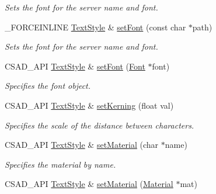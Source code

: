 \begin{DoxyCompactItemize}
\begin{DoxyCompactList}\small\item\em Sets the font for the server name and font. \end{DoxyCompactList}\item 
\hypertarget{classcsad_1_1_text_style_a6f824301e998e89906f260faa48f86ee}{\-\_\-\-F\-O\-R\-C\-E\-I\-N\-L\-I\-N\-E \hyperlink{classcsad_1_1_text_style}{Text\-Style} \& \hyperlink{classcsad_1_1_text_style_a6f824301e998e89906f260faa48f86ee}{set\-Font} (const char $\ast$path)}\label{classcsad_1_1_text_style_a6f824301e998e89906f260faa48f86ee}

\begin{DoxyCompactList}\small\item\em Sets the font for the server name and font. \end{DoxyCompactList}\item 
\hypertarget{classcsad_1_1_text_style_a5df3970f5c726e6dfb0263f153ec7e9b}{C\-S\-A\-D\-\_\-\-A\-P\-I \hyperlink{classcsad_1_1_text_style}{Text\-Style} \& \hyperlink{classcsad_1_1_text_style_a5df3970f5c726e6dfb0263f153ec7e9b}{set\-Font} (\hyperlink{classcsad_1_1_font}{Font} $\ast$font)}\label{classcsad_1_1_text_style_a5df3970f5c726e6dfb0263f153ec7e9b}

\begin{DoxyCompactList}\small\item\em Specifies the font object. \end{DoxyCompactList}\item 
\hypertarget{classcsad_1_1_text_style_aa5f55fddbde4fa1d88da5f578c81bf4b}{C\-S\-A\-D\-\_\-\-A\-P\-I \hyperlink{classcsad_1_1_text_style}{Text\-Style} \& \hyperlink{classcsad_1_1_text_style_aa5f55fddbde4fa1d88da5f578c81bf4b}{set\-Kerning} (float val)}\label{classcsad_1_1_text_style_aa5f55fddbde4fa1d88da5f578c81bf4b}

\begin{DoxyCompactList}\small\item\em Specifies the scale of the distance between characters. \end{DoxyCompactList}\item 
\hypertarget{classcsad_1_1_text_style_a15a3570f3ca090453331953226e72464}{C\-S\-A\-D\-\_\-\-A\-P\-I \hyperlink{classcsad_1_1_text_style}{Text\-Style} \& \hyperlink{classcsad_1_1_text_style_a15a3570f3ca090453331953226e72464}{set\-Material} (char $\ast$name)}\label{classcsad_1_1_text_style_a15a3570f3ca090453331953226e72464}

\begin{DoxyCompactList}\small\item\em Specifies the material by name. \end{DoxyCompactList}\item 
\hypertarget{classcsad_1_1_text_style_afc4e3ed006f391f10b412d390181654c}{C\-S\-A\-D\-\_\-\-A\-P\-I \hyperlink{classcsad_1_1_text_style}{Text\-Style} \& \hyperlink{classcsad_1_1_text_style_afc4e3ed006f391f10b412d390181654c}{set\-Material} (\hyperlink{classcsad_1_1_material}{Material} $\ast$mat)}\label{classcsad_1_1_text_style_afc4e3ed006f391f10b412d390181654c}


\end{DoxyCompactItemize}
